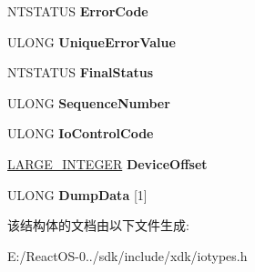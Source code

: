 \begin{DoxyCompactItemize}
N\+T\+S\+T\+A\+T\+US {\bfseries Error\+Code}
\item 
\mbox{\label{struct___i_o___e_r_r_o_r___l_o_g___p_a_c_k_e_t_a1c46df79ab2cc6a7d9bf6c8ad793cdcd}} 
U\+L\+O\+NG {\bfseries Unique\+Error\+Value}
\item 
\mbox{\label{struct___i_o___e_r_r_o_r___l_o_g___p_a_c_k_e_t_af6a5715c89cdb7a0b7839f984b9deb06}} 
N\+T\+S\+T\+A\+T\+US {\bfseries Final\+Status}
\item 
\mbox{\label{struct___i_o___e_r_r_o_r___l_o_g___p_a_c_k_e_t_a82ec915d450fc4f3cafb46d8fe2df2cd}} 
U\+L\+O\+NG {\bfseries Sequence\+Number}
\item 
\mbox{\label{struct___i_o___e_r_r_o_r___l_o_g___p_a_c_k_e_t_a3e98e0c72ca2bcfa59d6c66adb241b8a}} 
U\+L\+O\+NG {\bfseries Io\+Control\+Code}
\item 
\mbox{\label{struct___i_o___e_r_r_o_r___l_o_g___p_a_c_k_e_t_a763391993f54bf6cc7e0b91e3b1e543d}} 
\hyperlink{union___l_a_r_g_e___i_n_t_e_g_e_r}{L\+A\+R\+G\+E\+\_\+\+I\+N\+T\+E\+G\+ER} {\bfseries Device\+Offset}
\item 
\mbox{\label{struct___i_o___e_r_r_o_r___l_o_g___p_a_c_k_e_t_a29cf2633c7b73d616ac01d1a7bf41321}} 
U\+L\+O\+NG {\bfseries Dump\+Data} \mbox{[}1\mbox{]}
\end{DoxyCompactItemize}


该结构体的文档由以下文件生成\+:\begin{DoxyCompactItemize}
\item 
E\+:/\+React\+O\+S-\/0../sdk/include/xdk/iotypes.\+h\end{DoxyCompactItemize}
